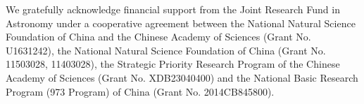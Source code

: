 \documentclass{raa}
\begin{document}
\newpage
\begin{acknowledgements}
We gratefully acknowledge financial support from the Joint Research Fund in Astronomy under a cooperative agreement between the National Natural Science Foundation of China and the Chinese Academy of Sciences (Grant No. U1631242), the National Natural Science Foundation of China (Grant No. 11503028, 11403028), the Strategic Priority Research Program of the Chinese Academy of Sciences (Grant No. XDB23040400) and the National Basic Research Program (973 Program) of China (Grant No. 2014CB845800).
\end{acknowledgements}



\end{document}
